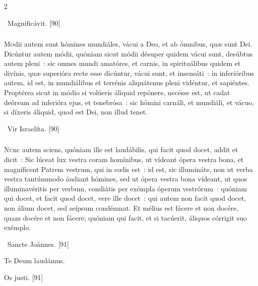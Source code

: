 \documentclass[9pt,twoside]{extarticle}
\begin{document}
\begin{multicols}{2}
\begin{tightlist}{}
\item {}~Magnificávit. [90]
\end{tightlist}

\subsubsection*{\center {}}
\lettrine{M}odii autem sunt hómines mundiáles, vácui a Deo, et ab ómnibus, quæ sunt Dei. Dicúntur autem módii, quóniam sicut módii désuper quidem vácui sunt, desúbtus autem pleni~: sic omnes mundi amatóres, et carnis, in spirituálibus quidem et divínis, quæ superióra recte esse dicúntur, vácui sunt, et insensáti~: in inferióribus autem, id est, in mundiálibus et terrénis aliquátenus pleni vidéntur, et sapiéntes. Proptérea sicut in módio si volúeris áliquid repónere, necésse est, ut cadat deórsum ad inferióra ejus, et tenebrósa~: sic hómini carnáli, et mundiáli, et vácuo, si díxeris áliquid, quod est Dei, non illud tenet.

\begin{tightlist}{}
\item {}~Vir Israelíta. [90]
\end{tightlist}

\subsubsection*{\center {}}
\lettrine{N}unc autem sciens, quóniam ille est laudábilis, qui facit quod docet, addit et dicit~: Sic lúceat lux vestra coram homínibus, ut vídeant ópera vestra bona, et magníficent Patrem vestrum, qui in cœlis est~: id est, sic illumináte, non ut verba vestra tantúmmodo áudiant hómines, sed ut ópera vestra bona vídeant, ut quos illuminavéritis per verbum, condiátis per exémpla óperum vestrórum~: quóniam qui docet, et facit quod docet, vere ille docet~: qui autem non facit quod docet, non álium docet, sed seípsum condémnat. Et mélius est fácere et non docére, quam docére et non fácere; quóniam qui facit, et si tacúerit, áliquos córrigit suo exémplo.

\begin{tightlist}{}
\item {}~Sancte Joánnes. [91]
\item Te Deum laudámus.
\item {} Os justi. [91]
\end{tightlist}


\end{multicols}
\end{document}
